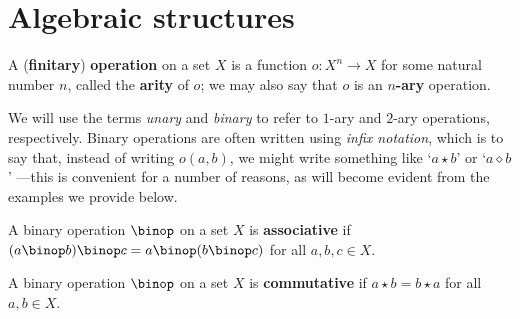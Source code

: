 \section{Algebraic structures}

\todo{}

\begin{definition}
\label{defOperation}
A (\textbf{finitary}) \textbf{operation} on a set $X$ is a function $o : X^n \to X$ for some natural number $n$, called the \textbf{arity} of $o$; we may also say that $o$ is an \textbf{$n$-ary} operation.
\end{definition}

We will use the terms \textit{unary} and \textit{binary} to refer to $1$-ary and $2$-ary operations, respectively. Binary operations are often written using \textit{infix notation}, which is to say that, instead of writing $o(a,b)$, we might write something like `$a \star b$'  or `$a \diamond b$' ---this is convenient for a number of reasons, as will become evident from the examples we provide below.

\begin{example}
\todo{}
\end{example}

\begin{exercise}
\todo{}
\end{exercise}

\begin{definition}
\label{defAssociative}
A binary operation $\binop$ on a set $X$ is \textbf{associative} if $(a \binop b) \binop c = a \binop (b \binop c)$ for all $a,b,c \in X$.
\end{definition}

\begin{example}
\todo{}
\end{example}

\begin{exercise}
\todo{}
\end{exercise}

\begin{exercise}
\todo{}
\end{exercise}

\todo{}

\begin{definition}
\label{defCommutativeOperation}
A binary operation $\binop$ on a set $X$ is \textbf{commutative} if $a \star b = b \star a$ for all $a,b \in X$.
\end{definition}

